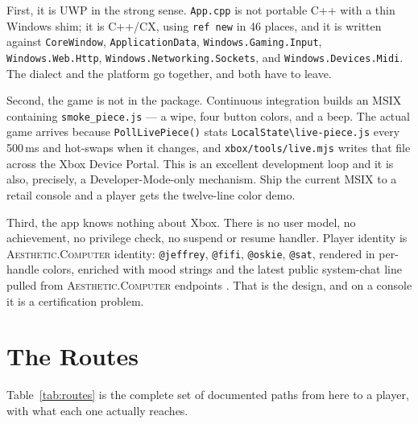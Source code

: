 \documentclass[10pt,letterpaper,twocolumn]{article}
\newcommand{\ac}{\textsc{Aesthetic.Computer}}
\newcommand{\code}[1]{\texttt{#1}}
\begin{document}
First, it is UWP in the strong sense. \code{App.cpp} is not portable C++ with a thin Windows shim; it is C++/CX, using \code{ref new} in 46 places, and it is written against \code{CoreWindow}, \code{Application\-Data}, \code{Windows.\allowbreak Gaming.\allowbreak Input}, \code{Windows.\allowbreak Web.\allowbreak Http}, \code{Windows.\allowbreak Networking.\allowbreak Sockets}, and \code{Windows.\allowbreak Devices.\allowbreak Midi}. The dialect and the platform go together, and both have to leave.

Second, the game is not in the package. Continuous integration builds an MSIX containing \code{smoke\_piece.js} --- a wipe, four button colors, and a beep. The actual game arrives because \code{PollLivePiece()} stats \code{LocalState\textbackslash live-piece.js} every 500\,ms and hot-swaps when it changes, and \code{xbox/tools/live.mjs} writes that file across the Xbox Device Portal. This is an excellent development loop and it is also, precisely, a Developer-Mode-only mechanism. Ship the current MSIX to a retail console and a player gets the twelve-line color demo.

Third, the app knows nothing about Xbox. There is no user model, no achievement, no privilege check, no suspend or resume handler. Player identity is \ac{} identity: \code{@jeffrey}, \code{@fifi}, \code{@oskie}, \code{@sat}, rendered in per-handle colors, enriched with mood strings and the latest public system-chat line pulled from \ac{} endpoints \cite{scudder2026url}. That is the design, and on a console it is a certification problem.

\section{The Routes}

Table~\ref{tab:routes} is the complete set of documented paths from here to a player, with what each one actually reaches.
\end{document}
